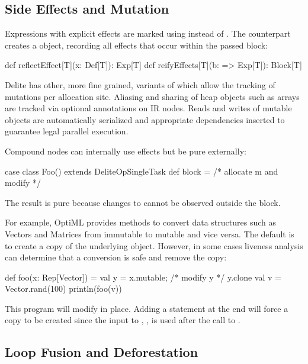 \subsection{Side Effects and Mutation}

Expressions with explicit effects are marked using
 instead of .
The counterpart  creates a
 object, recording all effects that occur
within the passed block:
\begin{listing}
def reflectEffect[T](x: Def[T]): Exp[T]
def reifyEffects[T](b: => Exp[T]): Block[T]
\end{listing}

Delite has other, more fine grained, variants of  which
allow the tracking of mutations per allocation site. Aliasing and sharing of
heap objects such as arrays are tracked via optional annotations on IR
nodes. Reads and writes of mutable objects are automatically serialized and
appropriate dependencies inserted to guarantee legal parallel execution.

Compound nodes can internally use effects but be pure externally:
\begin{listing}
case class Foo() extends DeliteOpSingleTask {
  def block = { /* allocate m and modify */ } }
\end{listing}
The result is pure because changes to  cannot
be observed outside the block.

For example, OptiML provides methods to convert data structures such as
Vectors and Matrices from immutable to mutable and vice versa.
The default is to create a copy of the underlying object.
However, in some cases liveness analysis can determine that a
conversion is safe and remove the copy:
\begin{listing}
def foo(x: Rep[Vector]) =
  val y = x.mutable; /* modify y */  y.clone
val v = Vector.rand(100)
println(foo(v))
\end{listing}
This program will modify  in place. Adding a statement 
at the end will force a copy to be created since the input to , ,
is used after the call to .


\subsection{Loop Fusion and Deforestation}

\newcommand{\yield}[0]{\leftarrow}
\newcommand{\G}[0]{\mathcal{G}}

